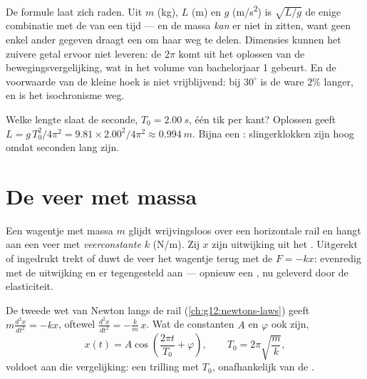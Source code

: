 \begin{remark}\label{rem:g12:oscillators-and-time:dimensional}
De formule laat zich raden. Uit $m$ (\unit{kg}), $L$ (\unit{m}) en $g$
(\unit{m/s^2}) is $\sqrt{L/g}$ de enige combinatie met de  van een
tijd --- en de massa \emph{kan} er niet in zitten, want geen enkel ander
gegeven draagt een  om haar weg te delen. Dimensies kunnen het zuivere
getal ervoor niet leveren: de $2\pi$ komt uit het oplossen van de
bewegingsvergelijking, wat in het volume van bachelorjaar 1 gebeurt. En de
voorwaarde van de kleine hoek is niet vrijblijvend: bij $30^\circ$ is de ware
 $2\%$ langer, en is het isochronisme weg.
\end{remark}

\begin{example}[De secondeslinger]\label{ex:g12:oscillators-and-time:seconds}
Welke lengte slaat de seconde, $T_0 = \qty{2.00}{s}$, één tik per kant?
Oplossen geeft $L = g\,T_0^2/4\pi^2 = 9.81 \times 2.00^2/4\pi^2 \approx
\qty{0.994}{m}$. Bijna een : slingerklokken zijn hoog omdat seconden
lang zijn.
\end{example}

\section{De veer met massa}

\begin{definition}\label{def:g12:oscillators-and-time:spring}
Een wagentje met massa $m$ glijdt wrijvingsloos over een horizontale rail en
hangt aan een veer met \emph{veerconstante} $k$
(\unit{N/m}). Zij $x$ zijn uitwijking uit het . Uitgerekt of
ingedrukt trekt of duwt de veer het wagentje terug met de  $F = -kx$:
evenredig met de uitwijking en er tegengesteld aan --- opnieuw een
, nu geleverd door de elasticiteit.
\end{definition}

\begin{proposition}\label{prop:g12:oscillators-and-time:spring-period}
De tweede wet van Newton langs de rail (\cref{ch:g12:newtons-laws}) geeft
$m \frac{d^2x}{dt^2} = -kx$, oftewel $\frac{d^2x}{dt^2} =
-\frac{k}{m}\,x$. Wat de constanten $A$ en $\varphi$ ook zijn,
\[
x(t) = A \cos\!\left(\frac{2\pi t}{T_0} + \varphi\right),
\qquad T_0 = 2\pi\sqrt{\frac{m}{k}},
\]
voldoet aan die vergelijking: een trilling met  $T_0$, onafhankelijk
van de .
\end{proposition}

